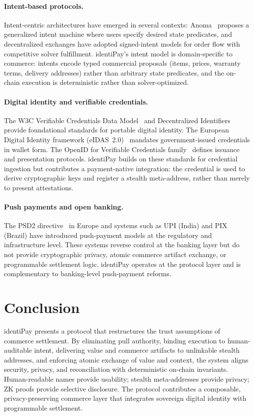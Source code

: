 \documentclass[11pt]{article}
\begin{document}
\paragraph{Intent-based protocols.}
Intent-centric architectures have emerged in several contexts: Anoma~\cite{anoma} proposes a generalized intent machine where users specify desired state predicates, and decentralized exchanges have adopted signed-intent models for order flow with competitive solver fulfillment. identiPay's intent model is domain-specific to commerce: intents encode typed commercial proposals (items, prices, warranty terms, delivery addresses) rather than arbitrary state predicates, and the on-chain execution is deterministic rather than solver-optimized.

\paragraph{Digital identity and verifiable credentials.}
The W3C Verifiable Credentials Data Model~\cite{vc-data-model} and Decentralized Identifiers~\cite{did-core} provide foundational standards for portable digital identity. The European Digital Identity framework (eIDAS~2.0)~\cite{eidas} mandates government-issued credentials in wallet form. The OpenID for Verifiable Credentials family~\cite{oid4vci,oid4vp} defines issuance and presentation protocols. identiPay builds on these standards for credential ingestion but contributes a payment-native integration: the credential is used to derive cryptographic keys and register a stealth meta-address, rather than merely to present attestations.

\paragraph{Push payments and open banking.}
The PSD2 directive~\cite{psd2} in Europe and systems such as UPI (India) and PIX (Brazil) have introduced push-payment models at the regulatory and infrastructure level. These systems reverse control at the banking layer but do not provide cryptographic privacy, atomic commerce artifact exchange, or programmable settlement logic. identiPay operates at the protocol layer and is complementary to banking-level push-payment reforms.

\section{Conclusion}
identiPay presents a protocol that restructures the trust assumptions of commerce settlement. By eliminating pull authority, binding execution to human-auditable intent, delivering value and commerce artifacts to unlinkable stealth addresses, and enforcing atomic exchange of value and context, the system aligns security, privacy, and reconciliation with deterministic on-chain invariants. Human-readable names provide usability; stealth meta-addresses provide privacy; ZK proofs provide selective disclosure. The protocol contributes a composable, privacy-preserving commerce layer that integrates sovereign digital identity with programmable settlement.
\end{document}
